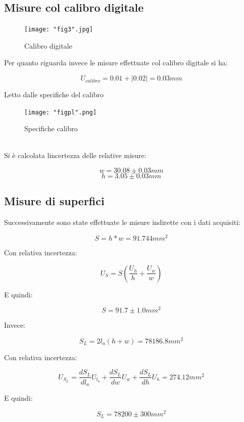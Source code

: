 \documentclass[a4paper]{article}
\begin{document}
\subsection{Misure col calibro digitale}
\begin{figure}[htp]
	\centering
	\texttt{[image: "fig3".jpg]}
	\caption{Calibro digitale}
	\label{}
\end{figure}
Per quanto riguarda invece le misure effettuate col calibro digitale si ha: 
\begin{Large} 
	\begin{equation}
		U_{calibro} = 0.01 + |0.02| = 0.03mm
	 \end{equation}
\end{Large}
Letto dalle specifiche del calibro
\begin{figure}[htp]
	\centering
	\texttt{[image: "figpl".png]}
	\caption{Specifiche calibro}
	\label{}
\end{figure}
\\Si è calcolata lincertezza delle relative misure: 
\begin{Large} 
	\begin{equation}
		w = 30.08\pm0.03mm
	 \end{equation}
	 \begin{equation}
		h = 3.05\pm0.03mm
	 \end{equation}
\end{Large}
\subsection{Misure di superfici}
Successivamente sono state effettuate le misure indirette con i dati acquisiti:
\begin{Large} 
	\begin{equation}
		S = h*w = 91.744 mm^2
	 \end{equation}
\end{Large}
Con relativa incertezza:
\begin{Large} 
	\begin{equation}
		U_{S} =S(\frac{U_h}{h}+\frac{U_w}{w})
	 \end{equation}
\end{Large}
E quindi: 
\begin{Large} 
	\begin{equation}
		S =91.7\pm 1.0mm^2
	 \end{equation}
\end{Large}
Invece:
\begin{Large} 
	\begin{equation}
		S_L= 2l_a(h+w) = 78186.8 mm^2
	 \end{equation}
\end{Large}
Con relativa incertezza:
\begin{Large} 
	\begin{equation}
		U_{S_L} =\frac{dS_L}{dl_a}U_{l_a}+\frac{dS_L}{dw}U_w+\frac{dS_L}{dh}U_h=274.12 mm^2
	 \end{equation}
\end{Large}
E quindi: 
\begin{Large} 
	\begin{equation}
		S_L =78200\pm 300mm^2
	 \end{equation}
\end{Large}
\end{document}
